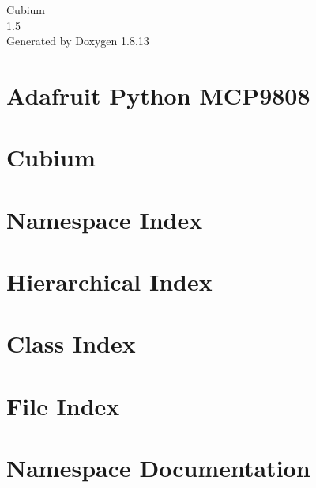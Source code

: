 \documentclass[twoside]{book}
\newcommand{\+}{\discretionary{\mbox{\scriptsize$\hookleftarrow$}}{}{}}
\newcommand{\clearemptydoublepage}{%
  \newpage{\pagestyle{empty}\cleardoublepage}%
}
\begin{document}
\hypersetup{pageanchor=false,
             bookmarksnumbered=true,
             pdfencoding=unicode
            }
\begin{titlepage}
\vspace*{7cm}
\begin{center}%
{\Large Cubium \\[1ex]\large 1.\+5 }\\
\vspace*{1cm}
{\large Generated by Doxygen 1.8.13}\\
\end{center}
\end{titlepage}
\clearemptydoublepage
{}
\tableofcontents
\clearemptydoublepage
{}
\hypersetup{pageanchor=true}

\chapter{Adafruit Python M\+C\+P9808}
\label{md_drivers_TempSensor_Adafruit_Python_MCP9808_README}

\chapter{Cubium}
\label{md_readme}

\chapter{Namespace Index}

\chapter{Hierarchical Index}

\chapter{Class Index}

\chapter{File Index}

\chapter{Namespace Documentation}





\end{document}
